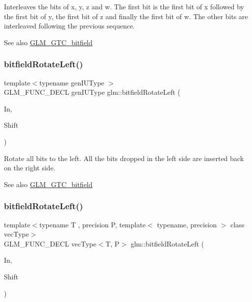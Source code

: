 Interleaves the bits of x, y, z and w. The first bit is the first bit of x followed by the first bit of y, the first bit of z and finally the first bit of w. The other bits are interleaved following the previous sequence.

\begin{DoxySeeAlso}{See also}
\hyperlink{group__gtc__bitfield}{G\+L\+M\+\_\+\+G\+T\+C\+\_\+bitfield} 
\end{DoxySeeAlso}
\mbox{\label{group__gtc__bitfield_ga2eb49678a344ce1495bdb5586d9896b9}} 
\subsubsection{\texorpdfstring{bitfield\+Rotate\+Left()}{bitfieldRotateLeft()}\hspace{0.1cm}{\footnotesize\ttfamily [1/2]}}
{\footnotesize\ttfamily template$<$typename gen\+I\+U\+Type $>$ \\
G\+L\+M\+\_\+\+F\+U\+N\+C\+\_\+\+D\+E\+CL gen\+I\+U\+Type glm\+::bitfield\+Rotate\+Left (\begin{DoxyParamCaption}\item[{gen\+I\+U\+Type}]{In,  }\item[{int}]{Shift }\end{DoxyParamCaption})}

Rotate all bits to the left. All the bits dropped in the left side are inserted back on the right side.

\begin{DoxySeeAlso}{See also}
\hyperlink{group__gtc__bitfield}{G\+L\+M\+\_\+\+G\+T\+C\+\_\+bitfield} 
\end{DoxySeeAlso}
\mbox{\label{group__gtc__bitfield_ga410d130917d85b865718e3ebc32cf0ef}} 
\subsubsection{\texorpdfstring{bitfield\+Rotate\+Left()}{bitfieldRotateLeft()}\hspace{0.1cm}{\footnotesize\ttfamily [2/2]}}
{\footnotesize\ttfamily template$<$typename T , precision P, template$<$ typename, precision $>$ class vec\+Type$>$ \\
G\+L\+M\+\_\+\+F\+U\+N\+C\+\_\+\+D\+E\+CL vec\+Type$<$T, P$>$ glm\+::bitfield\+Rotate\+Left (\begin{DoxyParamCaption}\item[{vec\+Type$<$ T, P $>$ const \&}]{In,  }\item[{int}]{Shift }\end{DoxyParamCaption})}

